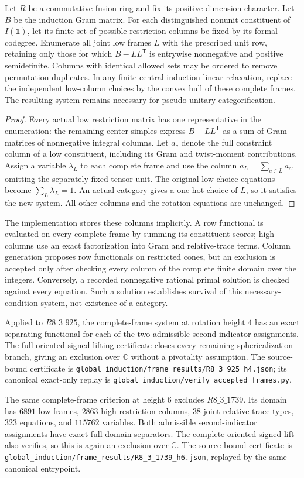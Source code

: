 \begin{proposition}
Let $R$ be a commutative fusion ring and fix its positive dimension
character. Let $B$ be the induction Gram matrix. For each distinguished
nonunit constituent of $I(\mathbf1)$, let its finite set of possible
restriction columns be fixed by its formal codegree. Enumerate all joint
low frames $L$ with the prescribed unit row, retaining only those for
which $B-LL^{\mathsf T}$ is entrywise nonnegative and positive
semidefinite. Columns with identical allowed sets may be ordered to
remove permutation duplicates. In any finite central-induction linear
relaxation, replace the independent low-column choices by the convex
hull of these complete frames. The resulting system remains necessary
for pseudo-unitary categorification.
\end{proposition}
\begin{proof}
Every actual low restriction matrix has one representative in the
enumeration: the remaining center simples express $B-LL^{\mathsf T}$
as a sum of Gram matrices of nonnegative integral columns. Let $a_c$
denote the full constraint column of a low constituent, including its
Gram and twist-moment contributions. Assign a variable $\lambda_L$ to
each complete frame and use the column $a_L=\sum_{c\in L}a_c$, omitting
the separately fixed tensor unit. The original low-choice equations
become $\sum_L\lambda_L=1$. An actual category gives a one-hot choice
of $L$, so it satisfies the new system. All other columns and the
rotation equations are unchanged.
\end{proof}

The implementation stores these columns implicitly. A row functional
is evaluated on every complete frame by summing its constituent scores;
high columns use an exact factorization into Gram and relative-trace
terms. Column generation proposes row functionals on restricted cones,
but an exclusion is accepted only after checking every column of the
complete finite domain over the integers. Conversely, a recorded
nonnegative rational primal solution is checked against every equation.
Such a solution establishes survival of this necessary-condition
system, not existence of a category.

Applied to $R8\_3\_925$, the complete-frame system at rotation height
$4$ has an exact separating functional for each of the two admissible
second-indicator assignments. The full oriented signed lifting
certificate closes every remaining sphericalization branch, giving an
exclusion over $\mathbb C$ without a pivotality assumption. The
source-bound certificate is
\texttt{global\_induction/frame\_results/R8\_3\_925\_h4.json}; its
canonical exact-only replay is
\texttt{global\_induction/verify\_accepted\_frames.py}.


The same complete-frame criterion at height $6$ excludes
$R8\_3\_1739$. Its domain has $6891$ low frames, $2863$ high
restriction columns, $38$ joint relative-trace types, $323$ equations,
and $115762$ variables. Both admissible second-indicator assignments
have exact full-domain separators. The complete oriented signed lift
also verifies, so this is again an exclusion over $\mathbb C$.
The source-bound certificate is
\texttt{global\_induction/frame\_results/R8\_3\_1739\_h6.json},
replayed by the same canonical entrypoint.

